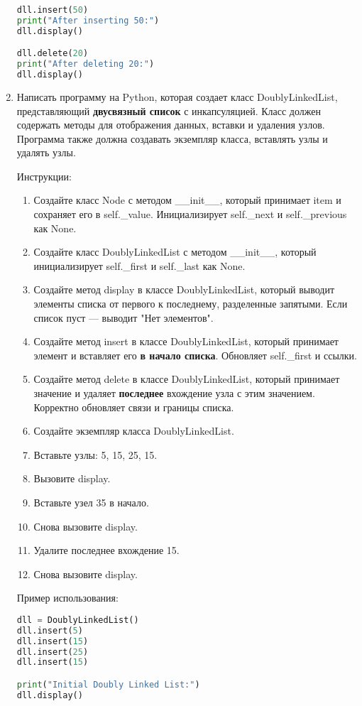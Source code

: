\begin{enumerate}
\begin{lstlisting}[language=Python]
dll.insert(50)
print("After inserting 50:")
dll.display()

dll.delete(20)
print("After deleting 20:")
dll.display()
\end{lstlisting}

\item Написать программу на Python, которая создает класс DoublyLinkedList, представляющий \textbf{двусвязный список} с инкапсуляцией. Класс должен содержать методы для отображения данных, вставки и удаления узлов. Программа также должна создавать экземпляр класса, вставлять узлы и удалять узлы.

Инструкции:
\begin{enumerate}
    \item Создайте класс Node с методом \_\_init\_\_, который принимает item и сохраняет его в self.\_value. Инициализирует self.\_next и self.\_previous как None.
    \item Создайте класс DoublyLinkedList с методом \_\_init\_\_, который инициализирует self.\_first и self.\_last как None.
    \item Создайте метод display в классе DoublyLinkedList, который выводит элементы списка от первого к последнему, разделенные запятыми. Если список пуст — выводит "Нет элементов".
    \item Создайте метод insert в классе DoublyLinkedList, который принимает элемент и вставляет его \textbf{в начало списка}. Обновляет self.\_first и ссылки.
    \item Создайте метод delete в классе DoublyLinkedList, который принимает значение и удаляет \textbf{последнее} вхождение узла с этим значением. Корректно обновляет связи и границы списка.
    \item Создайте экземпляр класса DoublyLinkedList.
    \item Вставьте узлы: 5, 15, 25, 15.
    \item Вызовите display.
    \item Вставьте узел 35 в начало.
    \item Снова вызовите display.
    \item Удалите последнее вхождение 15.
    \item Снова вызовите display.
\end{enumerate}

Пример использования:
\begin{lstlisting}[language=Python]
dll = DoublyLinkedList()
dll.insert(5)
dll.insert(15)
dll.insert(25)
dll.insert(15)

print("Initial Doubly Linked List:")
dll.display()


\end{lstlisting}
\end{enumerate}
